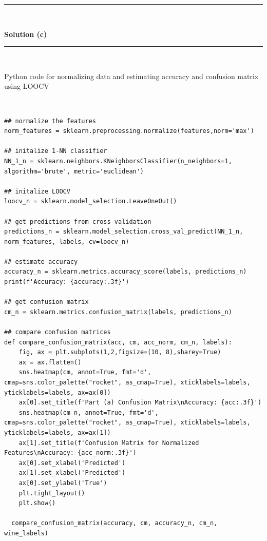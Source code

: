 \documentclass{article}
\begin{document}
\noindent\rule{\textwidth}{0.4pt}\\

\newpage

\textbf{Solution (c)}

\noindent\rule{\textwidth}{0.4pt}\\

\parbox{\textwidth}{Python code for normalizing data and estimating accuracy and confusion matrix using LOOCV}\\

\begin{center}

\begin{lstlisting}
## normalize the features
norm_features = sklearn.preprocessing.normalize(features,norm='max')
  
## initalize 1-NN classifier
NN_1_n = sklearn.neighbors.KNeighborsClassifier(n_neighbors=1, algorithm='brute', metric='euclidean')
  
## initalize LOOCV
loocv_n = sklearn.model_selection.LeaveOneOut()
  
## get predictions from cross-validation
predictions_n = sklearn.model_selection.cross_val_predict(NN_1_n, norm_features, labels, cv=loocv_n)
  
## estimate accuracy
accuracy_n = sklearn.metrics.accuracy_score(labels, predictions_n)
print(f'Accuracy: {accuracy:.3f}')
  
## get confusion matrix
cm_n = sklearn.metrics.confusion_matrix(labels, predictions_n)
  
## compare confusion matrices
def compare_confusion_matrix(acc, cm, acc_norm, cm_n, labels):
    fig, ax = plt.subplots(1,2,figsize=(10, 8),sharey=True)
    ax = ax.flatten()
    sns.heatmap(cm, annot=True, fmt='d', cmap=sns.color_palette("rocket", as_cmap=True), xticklabels=labels, yticklabels=labels, ax=ax[0])
    ax[0].set_title(f'Part (a) Confusion Matrix\nAccuracy: {acc:.3f}')
    sns.heatmap(cm_n, annot=True, fmt='d', cmap=sns.color_palette("rocket", as_cmap=True), xticklabels=labels, yticklabels=labels, ax=ax[1])
    ax[1].set_title(f'Confusion Matrix for Normalized Features\nAccuracy: {acc_norm:.3f}')
    ax[0].set_xlabel('Predicted')
    ax[1].set_xlabel('Predicted')
    ax[0].set_ylabel('True')
    plt.tight_layout()
    plt.show()
  
  compare_confusion_matrix(accuracy, cm, accuracy_n, cm_n, wine_labels)
\end{lstlisting}

\end{center}
\end{document}
